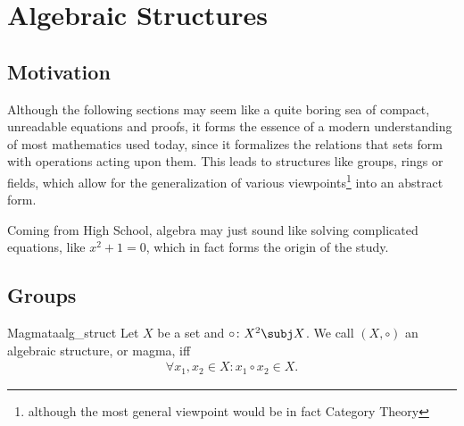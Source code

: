 \section{Algebraic Structures}\label{sec:alg_structures}

\subsection*{Motivation}\label{ssec:alg_motivation}

Although the following sections may seem like a quite boring sea of compact, unreadable equations and proofs, it forms
the essence of a modern understanding of most mathematics used today, since it formalizes the relations that sets form
with operations acting upon them. This leads to structures like groups, rings or fields, which allow for the 
generalization of various viewpoints\footnote{although the most general viewpoint would be in fact 
Category Theory} into an abstract form. 

Coming from High School, algebra may just sound like solving 
complicated equations, like $x^2 + 1 = 0$, which in fact forms the origin of the study.

\subsection{Groups}\label{ssec:groups}

\begin{definition}{Magmata}{alg_struct}
    Let $X$ be a set and $\circ\colon X^2\subj X$. We call $(X,\circ)$ an algebraic structure, or magma, iff
    \begin{align}
        \forall x_1,x_2 \in X\colon x_1\circ x_2 \in X.\label{eq:def_alg_struct}
    \end{align}
\end{definition}

